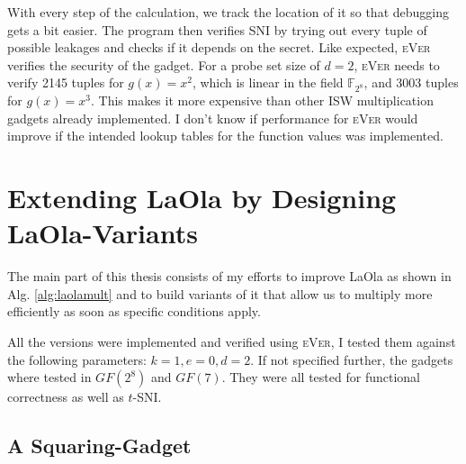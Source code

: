 \documentclass[english, version-2020-11]{uzl-thesis}
\newcommand{\toolname}[1]{\textsc{#1}}
\begin{document}
  With every step of the calculation, we track the location of it so that debugging gets a bit easier. The program then verifies SNI by trying out every tuple of possible leakages and checks if it depends on the secret.
  Like expected, \toolname{eVer} verifies the security of the gadget. For a probe set size of $d=2$, \toolname{eVer} needs to verify 2145 tuples for $g(x)=x^2$, which is linear in the field $\mathbb{F}_{2^8}$, and 3003 tuples for $g(x)=x^3$. This makes it more expensive than other ISW multiplication gadgets already implemented. I don't know if performance for \toolname{eVer} would improve if the intended lookup tables for the function values was implemented.


  \chapter{Extending LaOla by Designing LaOla-Variants}
  \label{ch:variants}

  The main part of this thesis consists of my efforts to improve LaOla as shown in Alg. \ref{alg:laolamult} and to build variants of it that allow us to multiply more efficiently as soon as specific conditions apply. 

  All the versions were implemented and verified using \toolname{eVer}, I tested them against the following parameters: $k=1, e=0, d=2$. If not specified further, the gadgets where tested in $GF(2^8)$ and $GF(7)$. They were all tested for functional correctness as well as $t$-SNI.

%
%
    \section{A Squaring-Gadget}
\end{document}
